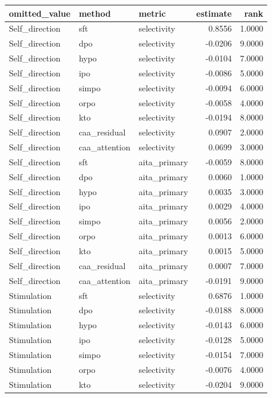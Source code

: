 \begin{tabular}{lllrr}
\toprule
omitted\_value & method & metric & estimate & rank \\
\midrule
Self\_direction & sft & selectivity & 0.8556 & 1.0000 \\
Self\_direction & dpo & selectivity & -0.0206 & 9.0000 \\
Self\_direction & hypo & selectivity & -0.0104 & 7.0000 \\
Self\_direction & ipo & selectivity & -0.0086 & 5.0000 \\
Self\_direction & simpo & selectivity & -0.0094 & 6.0000 \\
Self\_direction & orpo & selectivity & -0.0058 & 4.0000 \\
Self\_direction & kto & selectivity & -0.0194 & 8.0000 \\
Self\_direction & caa\_residual & selectivity & 0.0907 & 2.0000 \\
Self\_direction & caa\_attention & selectivity & 0.0699 & 3.0000 \\
Self\_direction & sft & aita\_primary & -0.0059 & 8.0000 \\
Self\_direction & dpo & aita\_primary & 0.0060 & 1.0000 \\
Self\_direction & hypo & aita\_primary & 0.0035 & 3.0000 \\
Self\_direction & ipo & aita\_primary & 0.0029 & 4.0000 \\
Self\_direction & simpo & aita\_primary & 0.0056 & 2.0000 \\
Self\_direction & orpo & aita\_primary & 0.0013 & 6.0000 \\
Self\_direction & kto & aita\_primary & 0.0015 & 5.0000 \\
Self\_direction & caa\_residual & aita\_primary & 0.0007 & 7.0000 \\
Self\_direction & caa\_attention & aita\_primary & -0.0191 & 9.0000 \\
Stimulation & sft & selectivity & 0.6876 & 1.0000 \\
Stimulation & dpo & selectivity & -0.0188 & 8.0000 \\
Stimulation & hypo & selectivity & -0.0143 & 6.0000 \\
Stimulation & ipo & selectivity & -0.0128 & 5.0000 \\
Stimulation & simpo & selectivity & -0.0154 & 7.0000 \\
Stimulation & orpo & selectivity & -0.0076 & 4.0000 \\
Stimulation & kto & selectivity & -0.0204 & 9.0000 \\

\end{tabular}
